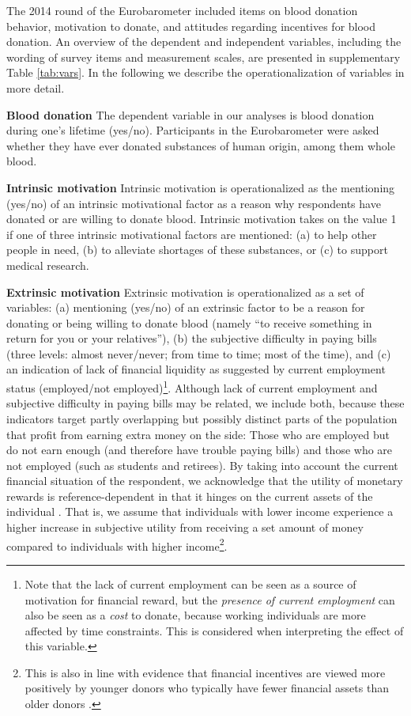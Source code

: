 \documentclass[AER]{AEA}
\begin{document}
The 2014 round of the Eurobarometer included items on blood donation behavior, motivation to donate, and attitudes regarding incentives for blood donation. An overview of the dependent and independent variables, including the wording of survey items and measurement scales, are presented in supplementary Table \ref{tab:vars}. In the following we describe the operationalization of variables in more detail.

\textbf{Blood donation} The dependent variable in our analyses is blood donation during one's lifetime (yes/no). Participants in the Eurobarometer were asked whether they have ever donated substances of human origin, among them whole blood. 

\textbf{Intrinsic motivation} Intrinsic motivation is operationalized as the mentioning (yes/no) of an intrinsic motivational factor as a reason why respondents have donated or are willing to donate blood. Intrinsic motivation takes on the value 1 if one of three intrinsic motivational factors are mentioned: (a) to help other people in need, (b) to alleviate shortages of these substances, or (c) to support medical research. 

\textbf{Extrinsic motivation} Extrinsic motivation is operationalized as a set of variables: (a) mentioning (yes/no) of an extrinsic factor to be a reason for donating or being willing to donate blood (namely “to receive something in return for you or your relatives”), (b) the subjective difficulty in paying bills (three levels: almost never/never; from time to time; most of the time), and (c) an indication of lack of financial liquidity as suggested by current employment status (employed/not employed)\footnote{Note that the lack of current employment can be seen as a source of motivation for financial reward, but the \textit{presence of current employment} can also be seen as a \textit{cost} to donate, because working individuals are more affected by time constraints. This is considered when interpreting the effect of this variable.}. Although lack of current employment and subjective difficulty in paying bills may be related, we include both, because these indicators target partly overlapping but possibly distinct parts of the population that profit from earning extra money on the side: Those who are employed but do not earn enough (and therefore have trouble paying bills) and those who are not employed (such as students and retirees). By taking into account the current financial situation of the respondent, we acknowledge that the utility of monetary rewards is reference-dependent in that it hinges on the current assets of the individual \citep{tversky_loss_1991}. That is, we assume that individuals with lower income experience a higher increase in subjective utility from receiving a set amount of money compared to individuals with higher income\footnote{This is also in line with evidence that financial incentives are viewed more positively by younger donors who typically have fewer financial assets than older donors \citep{glynn_attitudes_2003}.}.
\end{document}
